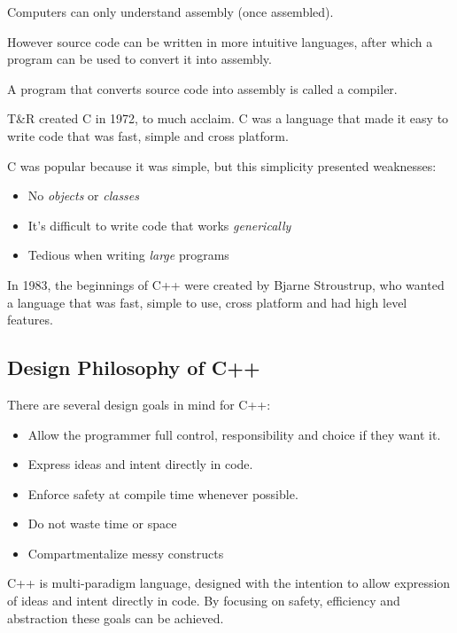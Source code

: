\documentclass[12pt]{article}
\begin{document}
Computers can only understand assembly (once assembled).

However source code can be written in more intuitive languages, after which a program can be used to convert it into assembly.

\begin{definition}
    A program that converts source code into assembly is called a compiler.
\end{definition}

T\&R created C in 1972, to much acclaim.
C was a language that made it easy to write code that was fast, simple and cross platform.

C was popular because it was simple, but this simplicity presented weaknesses:
\begin{itemize}
    \item No \emph{objects} or \emph{classes}
    \item It's difficult to write code that works \emph{generically}
    \item Tedious when writing \emph{large} programs
\end{itemize}

In 1983, the beginnings of C++ were created by Bjarne Stroustrup, who wanted a language that was fast, simple to use, cross platform and had high level features.


\subsection{Design Philosophy of C++}

There are several design goals in mind for C++:

\begin{itemize}
    \item Allow the programmer full control, responsibility and choice if they want it.
    \item Express ideas and intent directly in code.
    \item Enforce safety at compile time whenever possible.
    \item Do not waste time or space
    \item Compartmentalize messy constructs
\end{itemize}

C++ is multi-paradigm language, designed with the intention to allow expression of ideas and intent directly in code. By focusing on safety, efficiency and abstraction these goals can be achieved.
\end{document}
